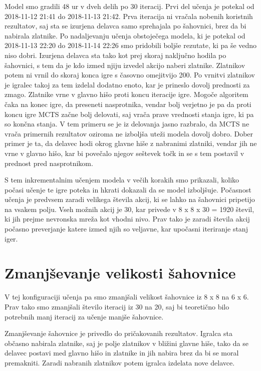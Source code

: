 \documentclass[a4paper, 12pt]{book}
\begin{document}
Model smo gradili 48 ur v dveh delih po 30 iteracij.
Prvi del učenja je potekal od 2018-11-12 21:41 do 2018-11-13 21:42.
Prva iteracija ni vračala nobenih koristnih rezultatov, saj sta se izurjena delavca samo sprehajala po šahovnici, brez da bi nabirala zlatnike.
Po nadaljevanju učenja obstoječega modela, ki je potekal od 2018-11-13 22:20 do 2018-11-14 22:26 smo pridobili boljše rezutate, ki pa še vedno niso dobri.
Izurjena delavca sta tako kot prej skoraj naključno hodila po šahovnici, s tem da je kdo izmed njiju izvedel akcijo naberi zlatnike.
Zlatnikov potem ni vrnil do skoraj konca igre s časovno omejitvijo 200. Po vrnitvi zlatnikov je igralec takoj za tem izdelal dodatno enoto, kar je prineslo dovolj prednosti za zmago.
Zlatnike vrne v glavno hišo proti koncu iteracije igre. Mogoče algoritem čaka na konec igre, da preseneti nasprotnika, vendar bolj verjetno je pa da proti koncu igre MCTS začne bolj delovati, saj vrača prave vrednosti stanja igre, ki pa so končna stanja.
V tem primeru se je iz delovanja jasno razbralo, da MCTS ne vrača primernih rezultatov oziroma ne izboljša uteži modela dovolj dobro.
Dober primer je ta, da delavec hodi okrog glavne hiše z nabranimi zlatniki, vendar jih ne vrne v glavno hišo, kar bi povečalo njegov seštevek točk in se s tem postavil v prednost pred nasprotnikom.


S tem inkrementalnim učenjem modela v večih korakih smo prikazali, koliko počasi učenje te igre poteka in hkrati dokazali da se model izboljšuje.
Počasnost učenja je predvsem zaradi velikega števila akcij, ki se lahko na šahovnici pripetijo na vsakem polju.
Vseh možnih akcij je 30, kar privede v 8 x 8 x 30 = 1920 števil, ki jih prejme nevronska mreža kot vhodni nivo.
Prav tako je zaradi števila akcij počasno preverjanje katere izmed njih so veljavne, kar upočasni iteriranje stanj iger.


\section{Zmanjševanje velikosti šahovnice}
\label{resultFourth}

V tej konfiguraciji učenja pa smo zmanjšali velikost šahovnice iz 8 x 8 na 6 x 6.
Prav tako smo zmanjšali število iteracij iz 30 na 20, saj bi teoretično bilo potrebnih manj iteracij za učenje manjše šahovnice.

Zmanjševanje šahovnice je privedlo do pričakovanih rezultatov.
Igralca sta občasno nabirala zlatnike, saj je polje zlatnikov v bližini glavne hiše, tako da se delavec postavi med glavno hišo in zlatnike in jih nabira brez da bi se moral premakniti.
Zaradi nabranih zlatnikov potem igralca izdelata nove delavce.
\end{document}
